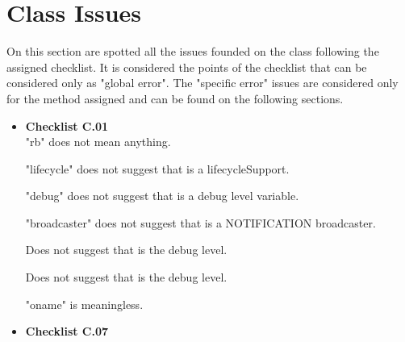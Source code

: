 \documentclass[../../../../codeInspection.tex]{subfiles}
\begin{document}
	\section{Class Issues}

		On this section are spotted all the issues founded on the class following the assigned checklist. It is considered the points of the checklist that can be considered only as "global error".
		The "specific error" issues are considered only for the method assigned and can be found on the following sections.

		\begin{itemize}

			\item \textbf{Checklist C.01} \\

				  

				  "rb" does not mean anything.

				  

				  "lifecycle" does not suggest that is a lifecycleSupport.

				  

				  "debug" does not suggest that is a debug level variable.

				  

				  "broadcaster" does not suggest that is a NOTIFICATION broadcaster.

				  

				  Does not suggest that is the debug level.

				  

				  Does not suggest that is the debug level.

				  

				  "oname" is meaningless.

		    \item \textbf{Checklist C.07}


\end{itemize}
\end{document}
